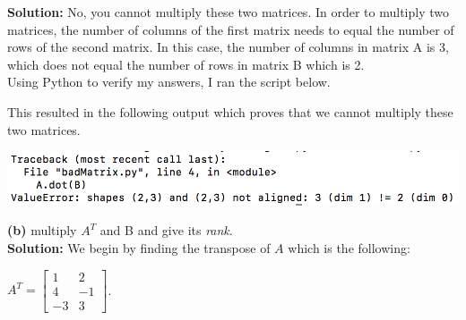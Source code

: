 \documentclass[a4paper]{article}
\begin{document}
\textbf{Solution:} No, you cannot multiply these two matrices.  In order to multiply 
two matrices, the number of columns of the first matrix needs to equal the number of 
rows of the second matrix.  In this case, the number of columns in matrix A is 3, which 
does not equal the number of rows in matrix B which is 2.\\
Using Python to verify my answers, I ran the script below.

This resulted in the following output which proves that we cannot multiply these two 
matrices.
\begin{center}
  \includegraphics[width=1\textwidth]{badMatrix.jpg}
\end{center}
\textbf{(b)} multiply $A^T$ and B and give its \textit{rank}.\\

\textbf{Solution:}
We begin by finding the transpose of $A$ which is the following:
\begin{center}
  $A^T =
\begin{bmatrix}
  1 & 2\\
  4 & -1\\
  -3 & 3
\end{bmatrix}$.
\end{center}
\end{document}
